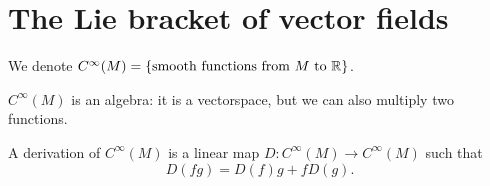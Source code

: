
\section{The Lie bracket of vector fields}
We denote $C^{\infty}(M)=\{\text{smooth functions from $M$ to $\mathbb{R}$}\}$.
\begin{remark}
    $C^{\infty}(M)$ is an algebra: it is a vectorspace, but we can also multiply two functions.
\end{remark}



\begin{definition}
    A derivation of $C^{\infty}(M)$ is a linear map $D: C^{\infty}(M) \to  C^{\infty}(M)$ such that
    \[
        D(fg) = D(f) g + f D(g)
    .\] 
\end{definition}


